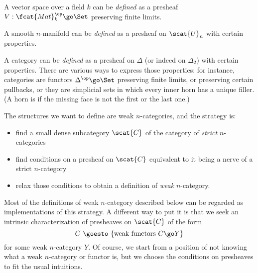 \begin{example}%
%
%
A vector space over a field $k$ can be \emph{defined} as a presheaf $V:
\fcat{Mat}_k^\op \go \Set$ preserving finite limits.
\end{example}

\begin{example}%
%
%
A smooth $n$-manifold can be \emph{defined} as a presheaf on $\scat{U}_n$
with certain properties.
\end{example}

\begin{example}	
A category can be \emph{defined} as a presheaf on $\Delta$%
%
%
(or indeed on $\Delta_2$) with certain properties.  There are various ways
to express those properties: for instance, categories are functors
$\Delta^\op \go \Set$ preserving finite limits, or preserving certain
pullbacks, or they are simplicial sets in which every inner horn%
%
%
has a
unique filler.  (A horn is %
%
%
%
if the missing face is not the first or the last one.)
\end{example}

%
%
The structures we want to define are weak $n$-categories, and the strategy
is:
%
\begin{itemize}
\item find a small dense subcategory $\scat{C}$ of the category of
  \emph{strict} $n$-categories
\item find conditions on a presheaf on $\scat{C}$ equivalent to it being a
  nerve of a strict $n$-category
\item relax%
%
%
those conditions to obtain a definition of \emph{weak}
  $n$-category.
\end{itemize}
%
Most of the definitions of weak $n$-category described below can be
regarded as implementations of this strategy.  A different way to put it is
that we seek an intrinsic characterization of presheaves on $\scat{C}$ of
the form
\[
C
\ \goesto\ 
\{ \textrm{weak functors } C \go Y \}
\]
for some weak $n$-category $Y$.  Of course, we start from a position of not
knowing what a weak $n$-category or functor is, but we choose the
conditions on presheaves to fit the usual intuitions.%
%
%



